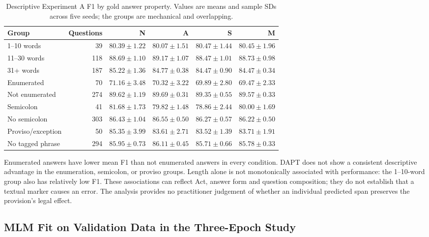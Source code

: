 \documentclass[pdflatex,sn-basic]{sn-jnl}
\begin{document}
\begin{table}[!htbp]
\caption{Descriptive Experiment A F1 by gold answer property. Values are means
and sample SDs across five seeds; the groups are mechanical and overlapping.}
\label{tab:difficulty}
\centering\scriptsize
\setlength{\tabcolsep}{4pt}
\begin{tabular}{@{}lrrrrr@{}}
\toprule
Group & Questions & N & A & S & M \\
\midrule
1--10 words & 39 & $80.39\pm1.22$ & $80.07\pm1.51$ & $80.47\pm1.44$ & $80.45\pm1.96$ \\
11--30 words & 118 & $88.69\pm1.10$ & $89.17\pm1.07$ & $88.47\pm1.01$ & $88.73\pm0.98$ \\
31+ words & 187 & $85.22\pm1.36$ & $84.77\pm0.38$ & $84.47\pm0.90$ & $84.47\pm0.34$ \\
Enumerated & 70 & $71.16\pm3.48$ & $70.32\pm3.22$ & $69.89\pm2.80$ & $69.47\pm2.33$ \\
Not enumerated & 274 & $89.62\pm1.19$ & $89.69\pm0.31$ & $89.35\pm0.55$ & $89.57\pm0.33$ \\
Semicolon & 41 & $81.68\pm1.73$ & $79.82\pm1.48$ & $78.86\pm2.44$ & $80.00\pm1.69$ \\
No semicolon & 303 & $86.43\pm1.04$ & $86.55\pm0.50$ & $86.27\pm0.57$ & $86.22\pm0.50$ \\
Proviso/exception & 50 & $85.35\pm3.99$ & $83.61\pm2.71$ & $83.52\pm1.39$ & $83.71\pm1.91$ \\
No tagged phrase & 294 & $85.95\pm0.73$ & $86.11\pm0.45$ & $85.71\pm0.66$ & $85.78\pm0.33$ \\
\bottomrule
\end{tabular}
\end{table}

Enumerated answers have lower mean F1 than not enumerated answers in every
condition. DAPT does not show a consistent descriptive advantage in the
enumeration, semicolon, or proviso groups. Length alone is not monotonically
associated with performance: the 1--10-word group also has relatively low
F1. These associations can reflect Act, answer form and question composition;
they do not establish that a textual marker causes an error.
The analysis provides no practitioner judgement of whether an individual
predicted span preserves the provision's legal effect.

\subsection{MLM Fit on Validation Data in the Three-Epoch Study}\label{sec:mlm}
\end{document}
